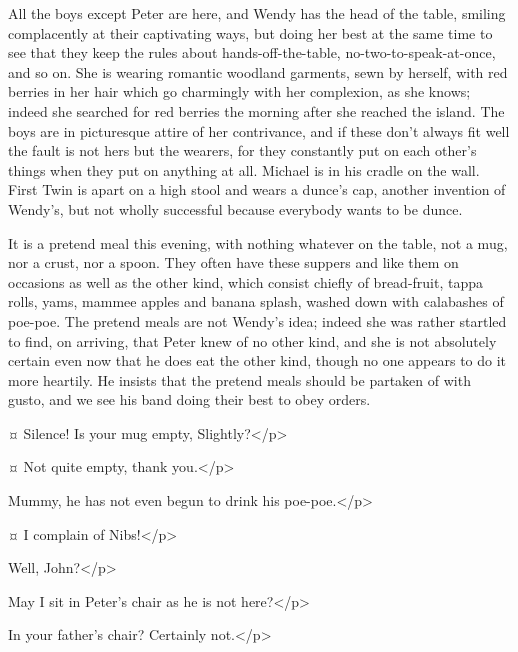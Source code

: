 \begin{stagedir}
All the boys except Peter are here, and Wendy has the head of the table, smiling complacently at their captivating ways, but doing her best at the same time to see that they keep the rules about hands-off-the-table, no-two-to-speak-at-once, and so on.
She is wearing romantic woodland garments, sewn by herself, with red berries in her hair which go charmingly with her complexion, as she knows; indeed she searched for red berries the morning after she reached the island.
The boys are in picturesque attire of her contrivance, and if these don't always fit well the fault is not hers but the wearers, for they constantly put on each other's things when they put on anything at all.
Michael is in his cradle on the wall.
First Twin is apart on a high stool and wears a dunce's cap, another invention of Wendy's, but not wholly successful because everybody wants to be dunce.

It is a pretend meal this evening, with nothing whatever on the table, not a mug, nor a crust, nor a spoon.
They often have these suppers and like them on occasions as well as the other kind, which consist chiefly of bread-fruit, tappa rolls, yams, mammee apples and banana splash, washed down with calabashes of poe-poe.
The pretend meals are not Wendy's idea; indeed she was rather startled to find, on arriving, that Peter knew of no other kind, and she is not absolutely certain even now that he does eat the other kind, though no one appears to do it more heartily.
He insists that the pretend meals should be partaken of with gusto, and we see his band doing their best to obey orders.
\end{stagedir}

\wendyspeaks {}¤
Silence!
Is your mug empty, Slightly?</p>

\slightlyspeaks {}¤
Not quite empty, thank you.</p>

\nibsspeaks
Mummy, he has not even begun to drink his poe-poe.</p>

\slightlyspeaks {}¤
I complain of Nibs!</p>


\wendyspeaks
Well, John?</p>

\johnspeaks
May I sit in Peter's chair as he is not here?</p>

\wendyspeaks
In your father's chair?
Certainly not.</p>

